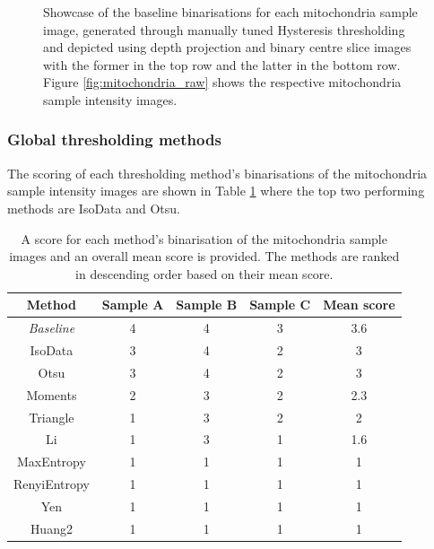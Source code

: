 \begin{figure}[ht!]
	\caption[Showcase of the baseline binarisations for each mitochondria sample image.]{Showcase of the baseline binarisations for each mitochondria sample image, generated through manually tuned Hysteresis thresholding and depicted using depth projection and binary centre slice images with the former in the top row and the latter in the bottom row. Figure \ref{fig:mitochondria_raw} shows the respective mitochondria sample intensity images.}
	\label{fig:mito_baseline}
\end{figure}
\FloatBarrier

\subsubsection{Global thresholding methods}
The scoring of each thresholding method's binarisations of the mitochondria sample intensity images are shown in Table \ref{tab:mito_global_ranks} where the top two performing methods are IsoData and Otsu.
\begin{table}[hb!]
	\centering
	\begin{tabular}{|c|c|c|c|c|}
		\hline
		\textbf{Method} & \textbf{Sample A} & \textbf{Sample B} & \textbf{Sample C} & \textbf{Mean score}\\
		\hline
		\textit{Baseline} & 4 & 4 & 3 & 3.6\\
		\hline
		IsoData & 3 & 4 & 2 & 3 \\
		\hline
		Otsu & 3 & 4 & 2 & 3 \\
		\hline
		Moments & 2 & 3 & 2 & 2.3 \\
		\hline
		Triangle & 1 & 3 & 2 & 2 \\
		\hline
		Li & 1 & 3 & 1 & 1.6 \\
		\hline
		MaxEntropy & 1 & 1 & 1 & 1 \\
		\hline
		RenyiEntropy & 1 & 1 & 1 & 1 \\
		\hline
		Yen & 1 & 1 & 1 & 1 \\
		\hline
		Huang2 & 1 & 1 & 1 & 1 \\
		\hline
	\end{tabular}
	\caption[A score for each method's binarisation of the mitochondria sample images with an overall mean score provided.]{A score for each method's binarisation of the mitochondria sample images and an overall mean score is provided. The methods are ranked in descending order based on their mean score.}
	\label{tab:mito_global_ranks}
\end{table}

